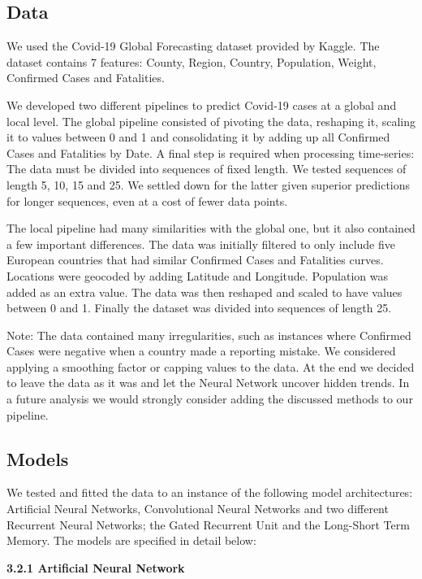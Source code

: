 \documentclass{article}
\begin{document}
\subsection{Data}

We used the Covid-19 Global Forecasting dataset provided by Kaggle. The dataset contains 7 features: County, Region, Country, Population, Weight, Confirmed Cases and Fatalities.

We developed two different pipelines to predict Covid-19 cases at a global and local level. The global pipeline consisted of pivoting the data, reshaping it, scaling it to values between 0 and 1 and consolidating it by adding up all Confirmed Cases and Fatalities by Date. A final step is required when processing time-series: The data must be divided into sequences of fixed length. We tested sequences of length 5, 10, 15 and 25. We settled down for the latter given superior predictions for longer sequences, even at a cost of fewer data points.

The local pipeline had many similarities with the global one, but it also contained a few important differences. The data was initially filtered to only include five European countries that had similar Confirmed Cases and Fatalities curves. Locations were geocoded by adding Latitude and Longitude. Population was added as an extra value. The data was then reshaped and scaled to have values between 0 and 1. Finally the dataset was divided into sequences of length 25.

Note: The data contained many irregularities, such as instances where Confirmed Cases were negative when a country made a reporting mistake. We considered applying a smoothing factor or capping values to the data. At the end we decided to leave the data as it was and let the Neural Network uncover hidden trends. In a future analysis we would strongly consider adding the discussed methods to our pipeline.

\subsection{Models}

We tested and fitted the data to an instance of the following model architectures: Artificial Neural Networks, Convolutional Neural Networks and two different Recurrent Neural Networks; the Gated Recurrent Unit and the Long-Short Term Memory. The models are specified in detail below:


\textbf{3.2.1 Artificial Neural Network}
\end{document}
